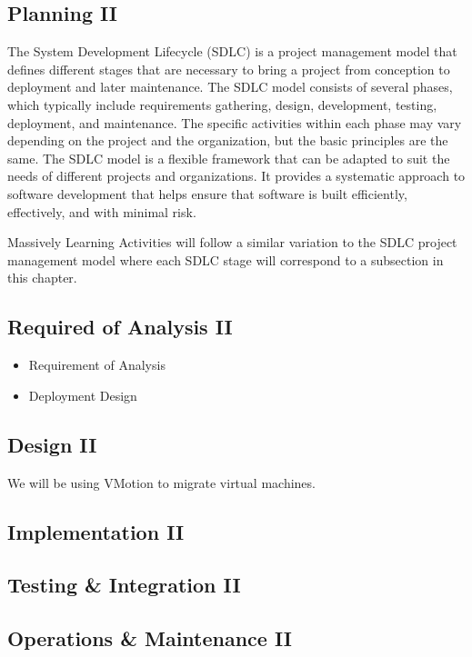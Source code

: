 \subsection{Planning II}

The System Development Lifecycle (SDLC) is a project management model that defines different stages that are necessary to bring a project from conception to deployment and later maintenance. The SDLC model consists of several phases, which typically include requirements gathering, design, development, testing, deployment, and maintenance. The specific activities within each phase may vary depending on the project and the organization, but the basic principles are the same. The SDLC model is a flexible framework that can be adapted to suit the needs of different projects and organizations. It provides a systematic approach to software development that helps ensure that software is built efficiently, effectively, and with minimal risk.

Massively Learning Activities will follow a similar variation to the SDLC project management model where each SDLC stage will correspond to a subsection in this chapter. 

\subsection{Required of Analysis II}
\begin{itemize}
    \item Requirement of Analysis
    \item Deployment Design
\end{itemize}

\subsection{Design II}
We will be using VMotion to migrate virtual machines. 

\subsection{Implementation II}

\subsection{Testing \& Integration II}

\subsection{Operations \& Maintenance II}

